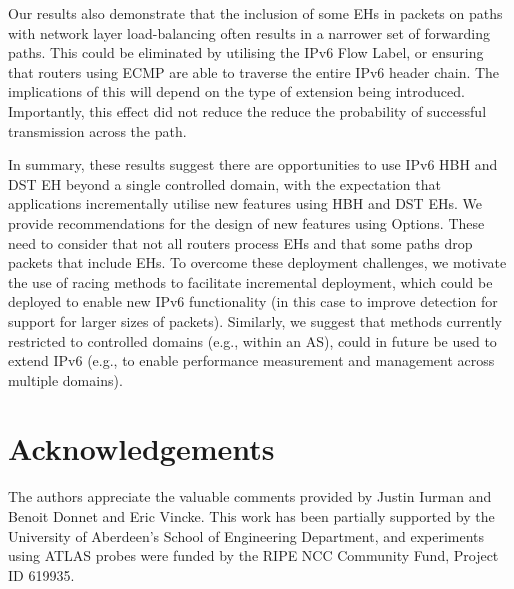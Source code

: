 \documentclass[conference]{IEEEtran}
\begin{document}
Our results also
demonstrate that the inclusion of some EHs in packets on paths with network layer load-balancing often results in a narrower set of forwarding paths. 
This  could be eliminated by utilising the IPv6 Flow Label, or ensuring that routers using ECMP are able to traverse the entire IPv6 header chain. The implications of this will depend on the type of extension being introduced. Importantly, this effect did not reduce the reduce the probability of successful transmission across the path.

In summary, these results suggest there are  opportunities to use IPv6 HBH and DST EH beyond a single controlled domain, with the expectation that applications incrementally utilise new features using HBH and DST EHs. We  provide recommendations for the design of new features using Options. These need to consider that not all routers process EHs and that some paths drop packets that include EHs. To overcome these deployment challenges, we motivate the use of racing methods to facilitate incremental deployment, which could be deployed to enable new IPv6 functionality (in this case to improve detection for support for larger sizes of packets). Similarly, we suggest that methods currently restricted to controlled domains (e.g., within an AS), could in future be used to extend IPv6 (e.g., to enable performance measurement and management across multiple domains).

\section*{Acknowledgements}

The authors appreciate the valuable comments provided by Justin Iurman and Benoit Donnet and Eric Vincke. This work has been partially supported by the University of Aberdeen's School of Engineering Department, and experiments using ATLAS probes were funded by the RIPE
NCC Community Fund, Project ID 619935.


\small

\end{document}
